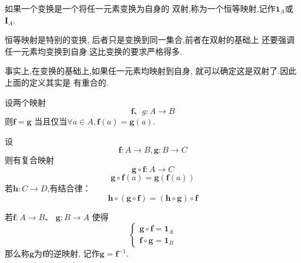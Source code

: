 \begin{formal}
\begin{definition}[恒等映射]\label{def:恒等映射}
    如果一个变换是一个将任一元素变换为自身的
双射,称为一个恒等映射,记作$\bm{1}_A$或
$\bm{I}_A.$
\end{definition}
\end{formal}
\begin{red}
\begin{remark}
    恒等映射是特别的变换,
    后者只是变换到同一集合,前者在双射的基础上
    还要强调
    任一元素均变换到自身.这比变换的要求严格得多.

    事实上,在变换的基础上,如果任一元素均映射到自身,
    就可以确定这是双射了.因此上面的定义其实是
    有重合的.
\end{remark}
\end{red}
\begin{formal}
\begin{definition}[映射的相同]\label{def:映射的相同}
    设两个映射
    \[
    \bm{f}\text{、}g:A\longrightarrow
    B
    \]
    则$\bm{f}=\bm{g}$
    当且仅当$\forall a \in A,\bm{f}
    \left(a
    \right) = \bm{g}
    \left(a\right)$.
\end{definition}
\end{formal}
\begin{formal}
\begin{definition}[复合映射]\label{def:复合映射}
    设
    \[
    \bm{f}
    :A \longrightarrow B ,
    \bm{g}
    :B \longrightarrow C
    \]
    则有复合映射
    \[
        \bm{g} \circ \bm{f} : 
        A \longrightarrow
        C 
    \]
    \[
        \bm{g} \circ \bm{f}
        \left(a\right)
        = \bm{g}
        \left(\bm{f}
        \left(a\right)\right)
    \]
    若$\bm{h}:
    C \longrightarrow D$,有结合律：
    \[
    \bm{h} 
    \circ \left(\bm{g}
     \circ \bm{f}
     \right)
    = \left(\bm{h}
     \circ \bm{g}
     \right) \circ \bm{f}
    \]
\end{definition}
\end{formal}
\begin{formal}
\begin{definition}[逆映射]\label{def:逆映射}
    若$\bm{f}:A\longrightarrow B$、
    $\bm{g} : B \longrightarrow A$
    使得
    \[
    \begin{cases*}
        \bm{g}\circ\bm{f}=\bm{1}_A\\
        \bm{f}\circ\bm{g}=\bm{1}_B
    \end{cases*}
    \]
    那么称$\bm{g}$为$\bm{f}$的逆映射,
    记作$\bm{g} = \bm{f}^{-1}.$
\end{definition}
\end{formal}
